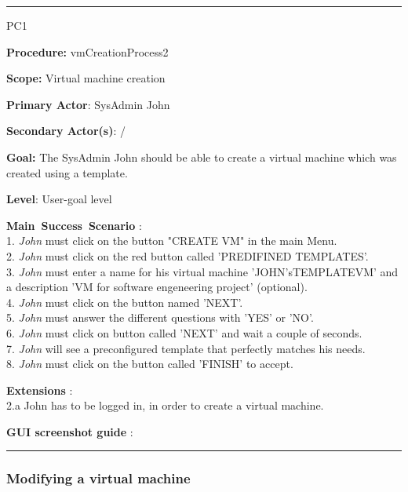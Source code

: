 \hrule
\vspace{0.5cm}
\begin{lyxlist}{PC1}
\small{
\item [\textbf{Procedure:}] vmCreationProcess2
\item [\textbf{Scope:}] Virtual machine creation
\item [\textbf{Primary Actor}:] SysAdmin John 
\item [\textbf{Secondary Actor(s)}:] /
\item [\textbf{Goal:}] The SysAdmin John should be able to create a virtual
machine which was created using a template.
\item [\textbf{Level}:] User-goal level
\item [\textbf{Main~Success~Scenario}]:\\
1. \emph{John} must click on the button "CREATE VM" in the main
Menu.\\
2. \emph{John} must click on the red button called 'PREDIFINED TEMPLATES'.\\ 
3. \emph{John} must enter a name for his virtual machine 'JOHN'sTEMPLATEVM' and
a description 'VM for software engeneering project' (optional).\\
4. \emph{John} must click on the button named 'NEXT'.\\
5. \emph{John} must answer the different questions with 'YES' or 'NO'.\\
6. \emph{John} must click on button called 'NEXT' and wait a couple of
seconds.\\
7. \emph{John} will see a preconfigured template that perfectly
matches his needs.\\
8. \emph{John} must click on the button called 'FINISH' to accept.\\


\item [\textbf{Extensions}]:\\
2.a John has to be logged in, in order to create a virtual machine.

\item [\textbf{GUI screenshot guide}]:\\
}
\end{lyxlist}
\hrule
\vspace{0.5cm}








\subsubsection{Modifying a virtual machine}

